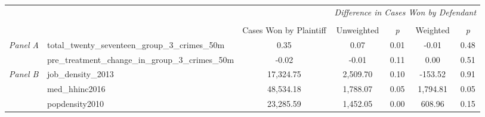\begin{tabular}{llccccc}
\toprule
 &  & \textit{} & \multicolumn{4}{c}{\textit{Difference in Cases Won by Defendant}} \\
\cline{4-7}
\\
 &  & Cases Won by Plaintiff & Unweighted & \emph{p} & Weighted & \emph{p} \\
\midrule
\multirow[c]{2}{3cm}{\textit{Panel A}} & total_twenty_seventeen_group_3_crimes_50m & 0.35 & 0.07 & 0.01 & -0.01 & 0.48 \\
 & pre_treatment_change_in_group_3_crimes_50m & -0.02 & -0.01 & 0.11 & 0.00 & 0.51 \\
\cline{1-7}
\multirow[c]{3}{3cm}{\textit{Panel B}} & job_density_2013 & 17,324.75 & 2,509.70 & 0.10 & -153.52 & 0.91 \\
 & med_hhinc2016 & 48,534.18 & 1,788.07 & 0.05 & 1,794.81 & 0.05 \\
 & popdensity2010 & 23,285.59 & 1,452.05 & 0.00 & 608.96 & 0.15 \\
\cline{1-7}
\bottomrule
\end{tabular}
